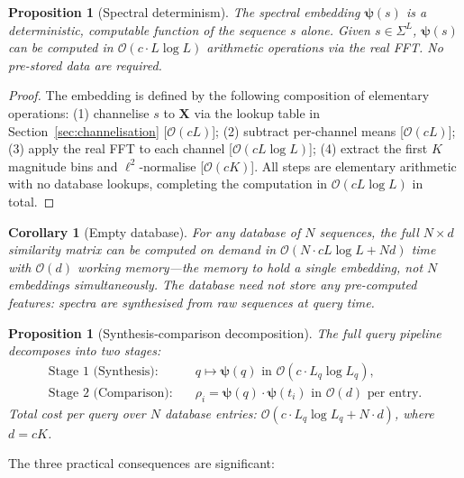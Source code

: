 \documentclass[twocolumn,11pt,a4paper]{article}
\newtheorem{proposition}[theorem]{Proposition}
\newtheorem{corollary}[theorem]{Corollary}
\theoremstyle{definition}
\theoremstyle{remark}
\begin{document}
\begin{proposition}[Spectral determinism]
\label{prop:determinism}
The spectral embedding $\bm{\psi}(s)$ is a deterministic, computable function
of the sequence $s$ alone. Given $s \in \Sigma^L$, $\bm{\psi}(s)$ can be
computed in $\mathcal{O}(c \cdot L\log L)$ arithmetic operations via the real
FFT. No pre-stored data are required.
\end{proposition}

\begin{proof}
The embedding is defined by the following composition of elementary operations:
(1) channelise $s$ to $\mathbf{X}$ via the lookup table in
Section~\ref{sec:channelisation} [$\mathcal{O}(cL)$];
(2) subtract per-channel means [$\mathcal{O}(cL)$];
(3) apply the real FFT to each channel [$\mathcal{O}(cL\log L)$];
(4) extract the first $K$ magnitude bins and $\ell^2$-normalise [$\mathcal{O}(cK)$].
All steps are elementary arithmetic with no database lookups, completing
the computation in $\mathcal{O}(cL\log L)$ in total.
\end{proof}

\begin{corollary}[Empty database]
\label{cor:empty_db}
For any database of $N$ sequences, the full $N \times d$ similarity matrix
can be computed on demand in $\mathcal{O}(N\cdot cL\log L + Nd)$ time with
$\mathcal{O}(d)$ working memory---the memory to hold a single embedding, not
$N$ embeddings simultaneously. The database need not store any pre-computed
features: spectra are synthesised from raw sequences at query time.
\end{corollary}

\begin{proposition}[Synthesis-comparison decomposition]
\label{prop:decomp}
The full query pipeline decomposes into two stages:
\begin{align}
  \text{Stage 1 (Synthesis):}  & \quad q \mapsto \bm{\psi}(q)
    \text{ in } \mathcal{O}(c\cdot L_q\log L_q),
    \label{eq:stage1}\\
  \text{Stage 2 (Comparison):} & \quad \rho_i = \bm{\psi}(q)\cdot\bm{\psi}(t_i)
    \text{ in } \mathcal{O}(d) \text{ per entry.}
    \label{eq:stage2}
\end{align}
Total cost per query over $N$ database entries:
$\mathcal{O}(c\cdot L_q\log L_q + N\cdot d)$, where $d = cK$.
\end{proposition}

The three practical consequences are significant:
\end{document}
